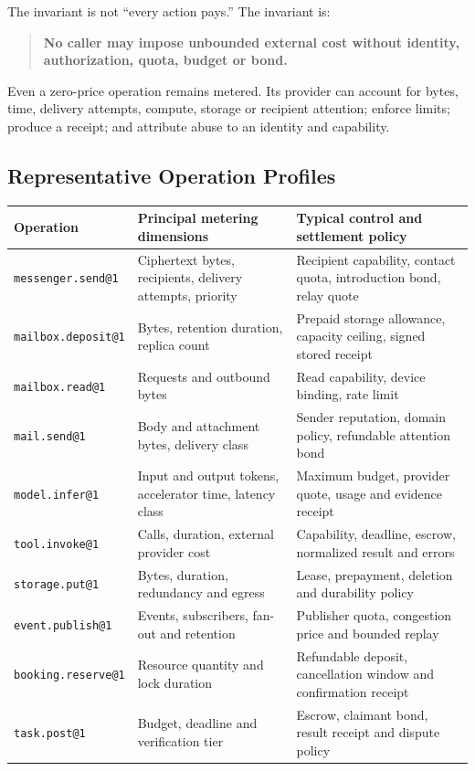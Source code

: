 \documentclass[11pt,oneside]{article}
\newcommand{\opid}[1]{\texttt{#1}}
\begin{document}
The invariant is not ``every action pays.'' The invariant is:

\begin{quote}
\textbf{No caller may impose unbounded external cost without identity, authorization, quota,
budget or bond.}
\end{quote}

Even a zero-price operation remains metered. Its provider can account for bytes, time,
delivery attempts, compute, storage or recipient attention; enforce limits; produce a receipt;
and attribute abuse to an identity and capability.

\subsection{Representative Operation Profiles}

\begin{longtable}{L{0.22\textwidth}L{0.31\textwidth}L{0.37\textwidth}}
\toprule
Operation & Principal metering dimensions & Typical control and settlement policy \\
\midrule
\endhead
\opid{messenger.send@1} &
Ciphertext bytes, recipients, delivery attempts, priority &
Recipient capability, contact quota, introduction bond, relay quote \\
\opid{mailbox.deposit@1} &
Bytes, retention duration, replica count &
Prepaid storage allowance, capacity ceiling, signed stored receipt \\
\opid{mailbox.read@1} &
Requests and outbound bytes &
Read capability, device binding, rate limit \\
\opid{mail.send@1} &
Body and attachment bytes, delivery class &
Sender reputation, domain policy, refundable attention bond \\
\opid{model.infer@1} &
Input and output tokens, accelerator time, latency class &
Maximum budget, provider quote, usage and evidence receipt \\
\opid{tool.invoke@1} &
Calls, duration, external provider cost &
Capability, deadline, escrow, normalized result and errors \\
\opid{storage.put@1} &
Bytes, duration, redundancy and egress &
Lease, prepayment, deletion and durability policy \\
\opid{event.publish@1} &
Events, subscribers, fan-out and retention &
Publisher quota, congestion price and bounded replay \\
\opid{booking.reserve@1} &
Resource quantity and lock duration &
Refundable deposit, cancellation window and confirmation receipt \\
\opid{task.post@1} &
Budget, deadline and verification tier &
Escrow, claimant bond, result receipt and dispute policy \\
\bottomrule
\end{longtable}
\end{document}
